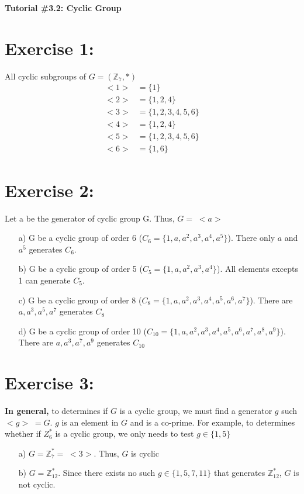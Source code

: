 \documentclass{article}
\newcommand{\Z}{\mathbb{Z}}
\begin{document}
	\centering
	\LARGE\textbf{Tutorial \#3.2: Cyclic Group}
	
	\justify\Large
	\section{Exercise 1:}
	All cyclic subgroups of $G = (\Z_7, *)$
		\begin{align*}
			<1> &= \{1\}\\
			<2> &= \{1,2,4\}\\
			<3> &= \{1,2,3,4,5,6\}\\
			<4> &= \{1,2,4\}\\
			<5> &= \{1,2,3,4,5,6\}\\
			<6> &= \{1,6\}
		\end{align*}
	
	\section{Exercise 2:}
		Let a be the generator of cyclic group G. Thus, $G = \;<a>$\\
		\begin{enumerate}
			\item [a)] G be a cyclic group of order 6 ($C_6 = \{1, a, a^2, a^3, a^4, a^5\}$). There only $a$ and $a^5$ generates $C_6$.
			\item [b)] G be a cyclic group of order 5 ($C_5 = \{1, a, a^2, a^3, a^4\}$). All elements excepts 1 can generate $C_5$.
			\item [c)] G be a cyclic group of order 8 ($C_8 = \{1, a, a^2, a^3, a^4, a^5, a^6, a^7\}$). There are $a, a^3, a^5, a^7$ generates $C_8$
			\item  [d)] G be a cyclic group of order 10 ($C_{10} = \{1, a, a^2, a^3, a^4, a^5, a^6, a^7, a^8, a^9\}$). There are $a, a^3, a^7, a^9$ generates $C_{10}$  
		\end{enumerate}
		
	\section{Exercise 3:}
		\textbf{In general,} to determines if $G$ is a cyclic group, we must find a generator $g$ such $<g> \; = G$. $g$ is an element in $G$ and is a co-prime.
		For example, to determines whether if $Z_6^*$ is a cyclic group, we only needs to test $g \in \{1, 5\}$ 
		\begin{enumerate}
			\item [a)] $G = \Z_7^* = \; <3>$. Thus, $G$ is cyclic
			\item [b)] $G = \Z_{12}^*$. Since there exists no such $g \in \{1,5,7,11\}$ that generates $\Z_{12}^*$, $G$ is not cyclic.
		\end{enumerate}
	
\end{document}
